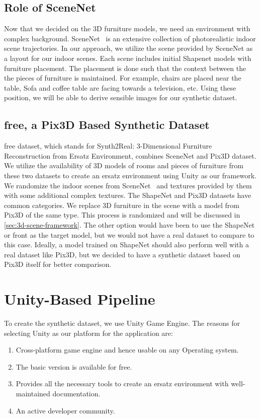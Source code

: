 \subsection{Role of SceneNet}\label{sec:role-of-scenenet}
Now that we decided on the 3D furniture models, we need an environment with complex background.
SceneNet~\cite{McCormac2017} is an extensive collection of photorealistic indoor scene trajectories.
In our approach, we utilize the scene provided by SceneNet as a layout for our indoor scenes.
Each scene includes initial Shapenet models with furniture placement.
The placement is done such that the context between the the pieces of furniture is maintained.
For example, chairs are placed near the table,
Sofa and coffee table are facing towards a television, etc.
Using these position, we will be able to derive sensible images for our synthetic dataset.

\subsection{\gls{free}, a Pix3D Based Synthetic Dataset}\label{sec:s2r:3d-free-a-pix3d-based-synthetic-dataset}

\gls{free} dataset, which stands for Synth2Real: 3-Dimensional Furniture Reconstruction from Ersatz Environment, combines SceneNet and Pix3D dataset.
We utilize the availability of 3D models of rooms and pieces of furniture from these two datasets to create an ersatz environment using Unity as our framework.
We randomize the indoor scenes from SceneNet~\cite{McCormac2017} and textures provided by them with some additional complex textures.
The ShapeNet and Pix3D datasets have common categories.
We replace 3D furniture in the scene with a model from Pix3D of the same type.
This process is randomized and will be discussed in \autoref{sec:3d-scene-framework}.
The other option would have been to use the ShapeNet or \gls{front} as the target model, but we would not have a real dataset to compare to this case.
Ideally, a model trained on ShapeNet should also perform well with a real dataset like Pix3D, but we decided to have a synthetic dataset based on Pix3D itself for better comparison.

\section{Unity-Based Pipeline}\label{sec:unity-based-pipeline}
To create the synthetic dataset, we use Unity Game Engine.
The reasons for selecting Unity as our platform for the application are:
\begin{enumerate}
    \item Cross-platform game engine and hence usable on any Operating system.
    \item The basic version is available for free.
    \item Provides all the necessary tools to create an ersatz environment with well-maintained documentation.
    \item An active developer community.
\end{enumerate}


